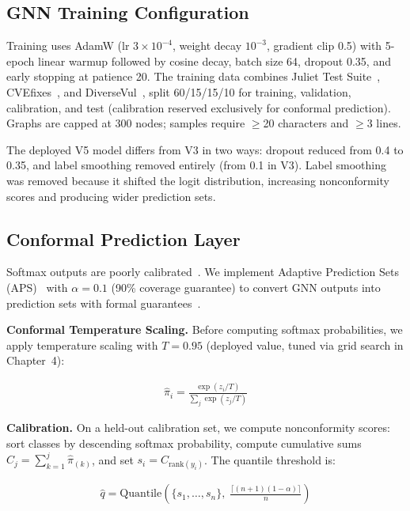 \subsection{GNN Training Configuration}

Training uses AdamW (lr $3 \times 10^{-4}$, weight decay $10^{-3}$, gradient clip 0.5) with 5-epoch linear warmup followed by cosine decay, batch size 64, dropout 0.35, and early stopping at patience 20. The training data combines Juliet Test Suite~\cite{juliet2017}, CVEfixes~\cite{cvefixes2021}, and DiverseVul~\cite{diversevul2023}, split 60/15/15/10 for training, validation, calibration, and test (calibration reserved exclusively for conformal prediction). Graphs are capped at 300 nodes; samples require $\geq$20 characters and $\geq$3 lines.

The deployed V5 model differs from V3 in two ways: dropout reduced from 0.4 to 0.35, and label smoothing removed entirely (from 0.1 in V3). Label smoothing was removed because it shifted the logit distribution, increasing nonconformity scores and producing wider prediction sets.

\subsection{Conformal Prediction Layer}

Softmax outputs are poorly calibrated~\cite{guocalibration2017}. We implement Adaptive Prediction Sets (APS)~\cite{romano2020} with $\alpha = 0.1$ (90\% coverage guarantee) to convert GNN outputs into prediction sets with formal guarantees~\cite{angelopoulos2023, vovk2005}.

\textbf{Conformal Temperature Scaling.} Before computing softmax probabilities, we apply temperature scaling with $T = 0.95$ (deployed value, tuned via grid search in Chapter~4):

\begin{align}
\hat{\pi}_i = \frac{\exp(z_i / T)}{\sum_j \exp(z_j / T)}
\label{eq:confts}
\end{align}

\textbf{Calibration.} On a held-out calibration set, we compute nonconformity scores: sort classes by descending softmax probability, compute cumulative sums $C_j = \sum_{k=1}^{j} \hat{\pi}_{(k)}$, and set $s_i = C_{\text{rank}(y_i)}$. The quantile threshold is:

\begin{align}
\hat{q} = \text{Quantile}\!\left(\{s_1, \ldots, s_n\},\; \frac{\lceil (n+1)(1-\alpha) \rceil}{n}\right)
\label{eq:aps-quantile}
\end{align}

